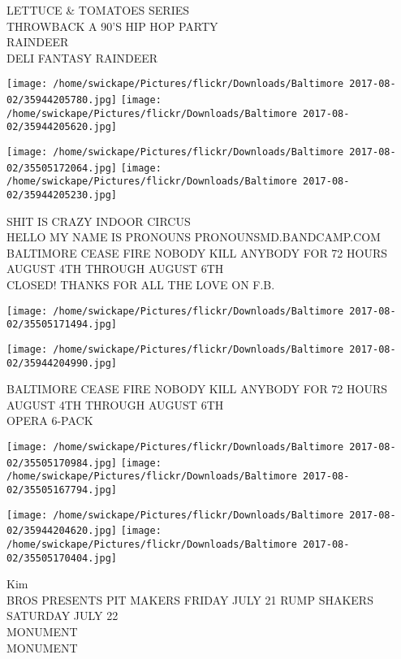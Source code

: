 \documentclass[10pt,letterpaper]{article}
\begin{document}
LETTUCE \& TOMATOES SERIES\\
THROWBACK A 90'S HIP HOP PARTY\\
RAINDEER\\
DELI FANTASY RAINDEER\\
\pagebreak

\texttt{[image: /home/swickape/Pictures/flickr/Downloads/Baltimore 2017-08-02/35944205780.jpg]}
\texttt{[image: /home/swickape/Pictures/flickr/Downloads/Baltimore 2017-08-02/35944205620.jpg]}

\texttt{[image: /home/swickape/Pictures/flickr/Downloads/Baltimore 2017-08-02/35505172064.jpg]}
\texttt{[image: /home/swickape/Pictures/flickr/Downloads/Baltimore 2017-08-02/35944205230.jpg]}

SHIT IS CRAZY INDOOR CIRCUS\\
HELLO MY NAME IS PRONOUNS PRONOUNSMD.BANDCAMP.COM\\
BALTIMORE CEASE FIRE NOBODY KILL ANYBODY FOR 72 HOURS AUGUST 4TH THROUGH AUGUST 6TH\\
CLOSED! THANKS FOR ALL THE LOVE ON F.B.\\
\pagebreak

\texttt{[image: /home/swickape/Pictures/flickr/Downloads/Baltimore 2017-08-02/35505171494.jpg]}

\vspace{0.25in}
\texttt{[image: /home/swickape/Pictures/flickr/Downloads/Baltimore 2017-08-02/35944204990.jpg]}

BALTIMORE CEASE FIRE NOBODY KILL ANYBODY FOR 72 HOURS AUGUST 4TH THROUGH AUGUST 6TH\\
OPERA 6{-}PACK\\
\pagebreak

\texttt{[image: /home/swickape/Pictures/flickr/Downloads/Baltimore 2017-08-02/35505170984.jpg]}
\texttt{[image: /home/swickape/Pictures/flickr/Downloads/Baltimore 2017-08-02/35505167794.jpg]}

\texttt{[image: /home/swickape/Pictures/flickr/Downloads/Baltimore 2017-08-02/35944204620.jpg]}
\texttt{[image: /home/swickape/Pictures/flickr/Downloads/Baltimore 2017-08-02/35505170404.jpg]}

Kim\\
BROS PRESENTS PIT MAKERS FRIDAY JULY 21 RUMP SHAKERS SATURDAY JULY 22\\
MONUMENT\\
MONUMENT\\
\pagebreak
\end{document}
